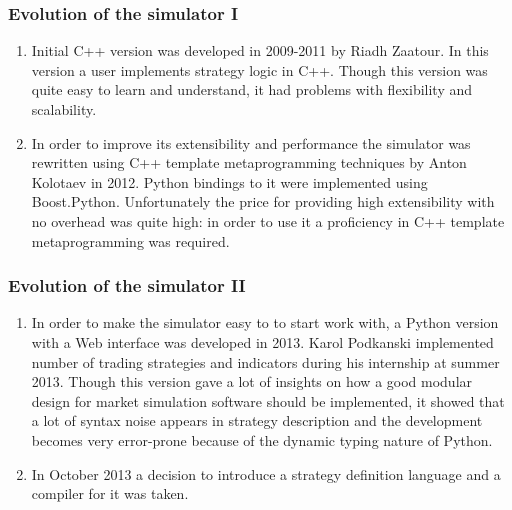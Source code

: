\documentclass{beamer}
\begin{document}
\begin{frame}
\frametitle{Evolution of the simulator I}
\begin{enumerate}
  \item Initial C++ version was developed in 2009-2011 by Riadh Zaatour. In this version a user implements strategy logic in C++. Though this version was quite easy to learn and understand, it had problems with flexibility and scalability.
  \item In order to improve its extensibility and performance the simulator was rewritten using C++ template metaprogramming techniques by Anton Kolotaev in 2012. Python bindings to it were implemented using Boost.Python. Unfortunately the price for providing high extensibility with no overhead was quite high: in order to use it a proficiency in C++ template metaprogramming was required.
\end{enumerate}
\end{frame}
\begin{frame}
\frametitle{Evolution of the simulator II}
\begin{enumerate}
  \item In order to make the simulator easy to to start work with, a Python version with a Web interface was developed in 2013. Karol Podkanski implemented number of trading strategies and indicators during his internship at summer 2013. Though this version gave a lot of insights on how a good modular design for market simulation software should be implemented, it showed that a lot of syntax noise appears in strategy description and the development becomes very error-prone because of the dynamic typing nature of Python.
  \item In October 2013 a decision to introduce a strategy definition language and a compiler for it was taken.
\end{enumerate}
\end{frame}
\end{document}
